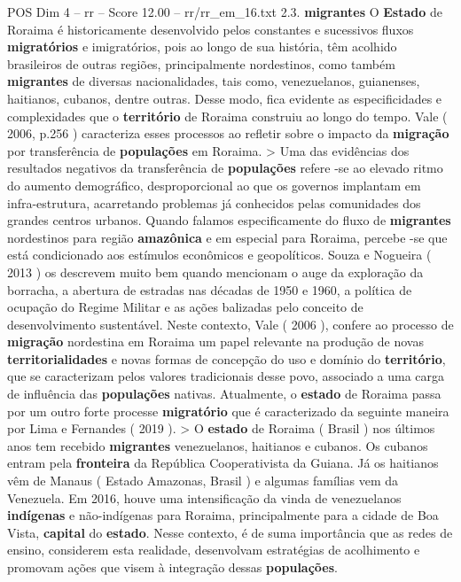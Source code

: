 \begin{textsample}{POS Dim 4 – rr – Score 12.00 – rr/rr\_em\_16.txt}  \label{ex:f4_pos_116}
2.3. \textbf{migrantes} O \textbf{Estado} de Roraima é historicamente desenvolvido pelos constantes e sucessivos fluxos \textbf{migratórios} e imigratórios, pois ao longo de sua história, têm acolhido brasileiros de outras regiões, principalmente nordestinos, como também \textbf{migrantes} de diversas nacionalidades, tais como, venezuelanos, guianenses, haitianos, cubanos, dentre outras.
Desse modo, fica evidente as especificidades e complexidades que o \textbf{território} de Roraima construiu ao longo do tempo.
Vale ( 2006, p.256 ) caracteriza esses processos ao refletir sobre o impacto da \textbf{migração} por transferência de \textbf{populações} em Roraima. > Uma das evidências dos resultados negativos da transferência de \textbf{populações} refere -se ao elevado ritmo do aumento demográfico, desproporcional ao que os governos implantam em infra-estrutura, acarretando problemas já conhecidos pelas comunidades dos grandes centros urbanos.
Quando falamos especificamente do fluxo de \textbf{migrantes} nordestinos para região \textbf{amazônica} e em especial para Roraima, percebe -se que está condicionado aos estímulos econômicos e geopolíticos.
Souza e Nogueira ( 2013 ) os descrevem muito bem quando mencionam o auge da exploração da borracha, a abertura de estradas nas décadas de 1950 e 1960, a política de ocupação do Regime Militar e as ações balizadas pelo conceito de desenvolvimento sustentável.
Neste contexto, Vale ( 2006 ), confere ao processo de \textbf{migração} nordestina em Roraima um papel relevante na produção de novas \textbf{territorialidades} e novas formas de concepção do uso e domínio do \textbf{território}, que se caracterizam pelos valores tradicionais desse povo, associado a uma carga de influência das \textbf{populações} nativas.
Atualmente, o \textbf{estado} de Roraima passa por um outro forte processe \textbf{migratório} que é caracterizado da seguinte maneira por Lima e Fernandes ( 2019 ). > O \textbf{estado} de Roraima ( Brasil ) nos últimos anos tem recebido \textbf{migrantes} venezuelanos, haitianos e cubanos.
Os cubanos entram pela \textbf{fronteira} da República Cooperativista da Guiana.
Já os haitianos vêm de Manaus ( Estado Amazonas, Brasil ) e algumas famílias vem da Venezuela.
Em 2016, houve uma intensificação da vinda de venezuelanos \textbf{indígenas} e não-indígenas para Roraima, principalmente para a cidade de Boa Vista, \textbf{capital} do \textbf{estado}.
Nesse contexto, é de suma importância que as redes de ensino, considerem esta realidade, desenvolvam estratégias de acolhimento e promovam ações que visem à integração dessas \textbf{populações}.

\end{textsample}
